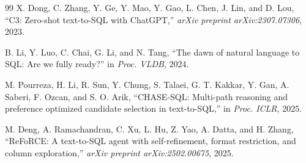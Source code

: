 \begin{thebibliography}{99}
 X. Dong, C. Zhang, Y. Ge, Y. Mao, Y. Gao, L. Chen, J. Lin, and D. Lou, “C3: Zero-shot text-to-SQL with ChatGPT,” \emph{arXiv preprint arXiv:2307.07306}, 2023.

 B. Li, Y. Luo, C. Chai, G. Li, and N. Tang, “The dawn of natural language to SQL: Are we fully ready?” in \emph{Proc. VLDB}, 2024.

 M. Pourreza, H. Li, R. Sun, Y. Chung, S. Talaei, G. T. Kakkar, Y. Gan, A. Saberi, F. Ozcan, and S. O. Arik, “CHASE-SQL: Multi-path reasoning and preference optimized candidate selection in text-to-SQL,” in \emph{Proc. ICLR}, 2025.

 M. Deng, A. Ramachandran, C. Xu, L. Hu, Z. Yao, A. Datta, and H. Zhang, “ReFoRCE: A text-to-SQL agent with self-refinement, format restriction, and column exploration,” \emph{arXiv preprint arXiv:2502.00675}, 2025.

\end{thebibliography}
